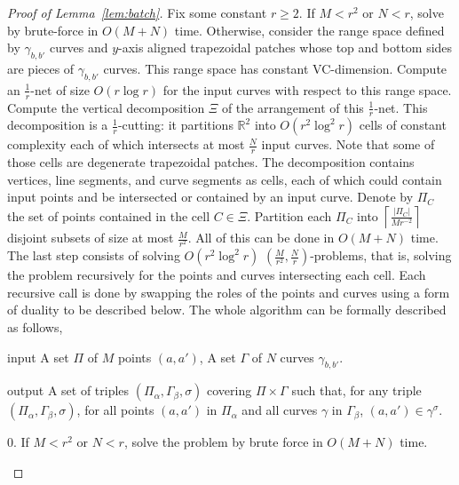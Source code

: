 \begin{proof}[Proof of Lemma~\ref{lem:batch}]
Fix some constant $r \geq 2$.
If $M < r^2$ or $N < r$, solve by brute-force in $O(M+N)$ time. Otherwise,
consider the range space defined by $\gamma_{b,b'}$ curves and $y$-axis aligned
trapezoidal patches whose top and bottom sides are pieces of $\gamma_{b,b'}$
curves. This range space has constant VC-dimension.
Compute an $\frac 1r$-net of size $O(r \log r)$ for the input curves with respect to
this range space. Compute the vertical decomposition \(\Xi\) of the arrangement
of this $\frac 1r$-net. This decomposition is a $\frac 1r$-cutting: it partitions
$\mathbb{R}^2$ into $O(r^2 \log^2 r)$ cells of constant complexity each of
which intersects at most \(\frac{N}{r}\) input curves.
Note that some of those cells are degenerate trapezoidal
patches. The decomposition contains vertices, line segments, and curve
segments as cells, each of which could contain input points and be intersected
or contained by an input curve.
Denote by \(\Pi_C\) the set of points contained in the cell \(C \in \Xi\).
Partition each \(\Pi_C\) into \(\left\lceil \frac{\lvert \Pi_C \rvert}{M
r^{-2}} \right\rceil\) disjoint subsets of size at most \(\frac{M}{r^2}\). All
of this can be done in \(O(M+N)\) time.
The last step consists of solving \(O(r^2 \log^2 r)\)
\((\frac{M}{r^2},\frac{N}{r})\)-problems, that is, solving the problem
recursively for the points and curves intersecting each cell.
Each recursive call is done by swapping the roles of the points and curves
using a form of duality to be described below.
The whole algorithm can be formally described as follows,
\begin{algorithm}\label{algo:pbrs}
\item[input] A set $\Pi$ of $M$ points $(a,a')$, A set $\Gamma$ of $N$ curves $\gamma_{b,b'}$.
\item[output] A set of triples $(\Pi_\alpha,\Gamma_\beta,\sigma)$ covering $\Pi \times \Gamma$
    such that, for any triple\\
    $(\Pi_\alpha,\Gamma_\beta,\sigma)$,
    for all points $(a,a')$ in $\Pi_\alpha$ and all curves $\gamma$ in
    $\Gamma_\beta$,
    $(a,a') \in \gamma^\sigma$.
\item[0.] If $M < r^2$ or $N < r$, solve the problem by brute force in $O(M+N)$ time.

\end{algorithm}
\end{proof}

